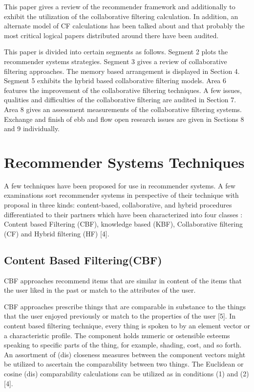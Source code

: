 \documentclass[10pt,conference]{IEEEtran}
\begin{document}
This paper gives a review of the recommender framework and additionally to exhibit the utilization of the collaborative filtering calculation. In addition, an alternate model of CF calculations has been talked about and that probably the most critical logical papers distributed around there have been audited.

This paper is divided into certain segments as follows. Segment 2 plots the recommender systems strategies. Segment 3 gives a review of collaborative filtering approaches. The memory based arrangement is displayed in Section 4. Segment 5 exhibits the hybrid based collaborative filtering models. Area 6 features the improvement of the collaborative filtering techniques. A few issues, qualities and difficulties of the collaborative filtering are audited in Section 7. Area 8 gives an assessment measurements of the collaborative filtering systems. Exchange and finish of ebb and flow open research issues are given in Sections 8 and 9 individually.

\cite{su2009survey}
\cite{zuva2012survey}
\cite{herlocker2004evaluating}
\cite{linden2003amazon}
\cite{adomavicius2005toward}
\cite{park2012literature}


\section{Recommender Systems Techniques}
A few techniques have been proposed for use in recommender systems. A few examinations sort recommender systems in perspective of their technique with proposal in three kinds: content-based, collaborative, and hybrid procedures differentiated to their partners which have been characterized into four classes : Content based Filtering (CBF), knowledge based (KBF), Collaborative filtering (CF) and Hybrid filtering (HF) [4].

\subsection{Content Based Filtering(CBF)}
CBF approaches recommend items that are similar in content of the items that the user liked in the past or match to the attributes of the user.

CBF approaches prescribe things that are comparable in substance to the things that the user enjoyed previously or match to the properties of the user [5]. In content based filtering technique, every thing is spoken to by an element vector or a characteristic profile. The component holds numeric or ostensible esteems speaking to specific parts of the thing, for example, shading, cost, and so forth. An assortment of (dis) closeness measures between the component vectors might be utilized to ascertain the comparability between two things. The Euclidean or cosine (dis) comparability calculations can be utilized as in conditions (1) and (2) [4].
\end{document}
